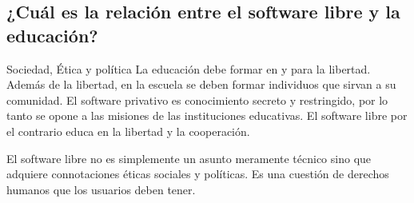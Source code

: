 \documentclass{beamer}
\begin{document}
\subsection{¿Cuál es la relación entre el software libre y la educación?}
\begin{frame}{Sociedad, Ética y política}
La educación debe formar en y para la libertad. Además de la libertad, en la escuela se deben formar individuos que sirvan a su comunidad. El software privativo es conocimiento secreto y restringido, por lo tanto se opone a las misiones de las instituciones educativas. El software libre por el contrario educa en la libertad y la cooperación.

El software libre no es simplemente un asunto meramente técnico sino que adquiere connotaciones éticas sociales y políticas. Es una cuestión de derechos humanos que los usuarios deben tener.\cite{rms}
\end{frame}
\end{document}
